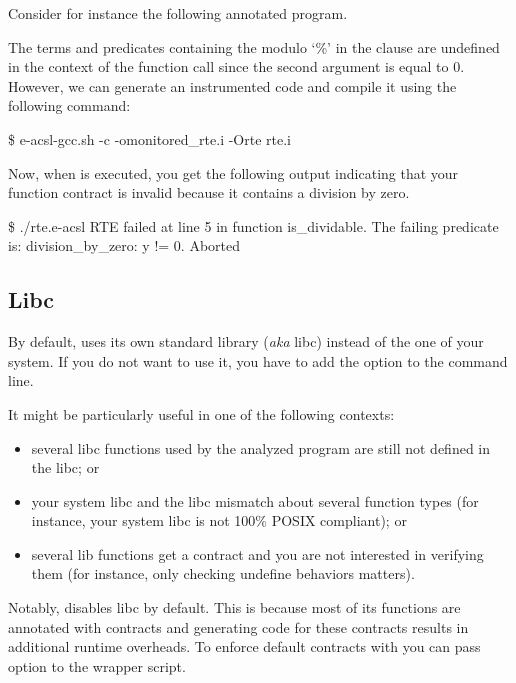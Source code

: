Consider for instance the following annotated program.


The terms and predicates containing the modulo `\%' in the  clause
are undefined in the context of the  function call since the second
argument is equal to 0.  However, we can generate an instrumented code and
compile it using the following command:

\begin{logs}
\$ e-acsl-gcc.sh -c -omonitored_rte.i -Orte rte.i
\end{logs}

Now, when  is executed, you get the following output indicating
that your function contract is invalid because it contains a division by zero.

\begin{logs}
\$ ./rte.e-acsl
RTE failed at line 5 in function is_dividable.
The failing predicate is:
division_by_zero: y != 0.
Aborted
\end{logs}


\subsection{Libc}

By default, \framac uses its own standard library (\emph{aka} libc) instead of
the one of your system. If you do not want to use it, you have to add the option
 to the \framac command
line.

It might be particularly useful in one of the following contexts:
\begin{itemize}
  \item several libc functions used by the analyzed program are still not defined
        in the \framac libc; or
  \item your system libc and the \framac libc mismatch about several function
        types (for instance, your system libc is not 100\% POSIX compliant); or
  \item several \framac lib functions get a contract and you are not interested in
        verifying them (for instance, only checking undefine behaviors matters).
\end{itemize}

\begin{important}
  Notably, \eacslgcc disables \framac libc by default. This is because most of
  its functions are annotated with \eacsl contracts and generating code for
  these contracts results in additional runtime overheads. To enforce default
  \framac contracts with \eacslgcc you can pass  option to the wrapper
  script.
\end{important}

